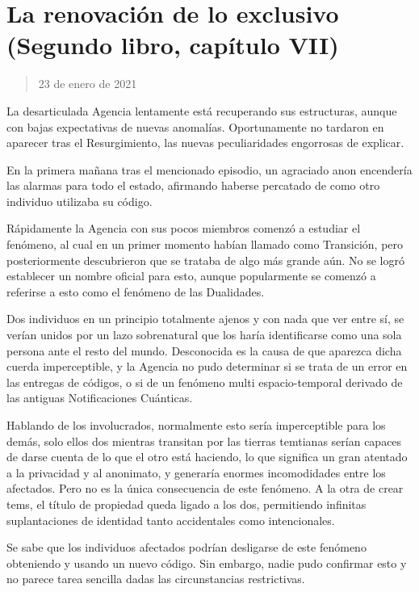 \documentclass[
]{book}
\begin{document}
\hypertarget{la-renovaciuxf3n-de-lo-exclusivo-segundo-libro-capuxedtulo-vii}{%
\section{La renovación de lo exclusivo (Segundo libro, capítulo VII)}\label{la-renovaciuxf3n-de-lo-exclusivo-segundo-libro-capuxedtulo-vii}}

\begin{quote}
23 de enero de 2021
\end{quote}

La desarticulada Agencia lentamente está recuperando sus estructuras, aunque con bajas expectativas de nuevas anomalías. Oportunamente no tardaron en aparecer tras el Resurgimiento, las nuevas peculiaridades engorrosas de explicar.

En la primera mañana tras el mencionado episodio, un agraciado anon encendería las alarmas para todo el estado, afirmando haberse percatado de como otro individuo utilizaba su código.

Rápidamente la Agencia con sus pocos miembros comenzó a estudiar el fenómeno, al cual en un primer momento habían llamado como Transición, pero posteriormente descubrieron que se trataba de algo más grande aún. No se logró establecer un nombre oficial para esto, aunque popularmente se comenzó a referirse a esto como el fenómeno de las Dualidades.

Dos individuos en un principio totalmente ajenos y con nada que ver entre sí, se verían unidos por un lazo sobrenatural que los haría identificarse como una sola persona ante el resto del mundo. Desconocida es la causa de que aparezca dicha cuerda imperceptible, y la Agencia no pudo determinar si se trata de un error en las entregas de códigos, o si de un fenómeno multi espacio-temporal derivado de las antiguas Notificaciones Cuánticas.

Hablando de los involucrados, normalmente esto sería imperceptible para los demás, solo ellos dos mientras transitan por las tierras temtianas serían capaces de darse cuenta de lo que el otro está haciendo, lo que significa un gran atentado a la privacidad y al anonimato, y generaría enormes incomodidades entre los afectados. Pero no es la única consecuencia de este fenómeno. A la otra de crear tems, el título de propiedad queda ligado a los dos, permitiendo infinitas suplantaciones de identidad tanto accidentales como intencionales.

Se sabe que los individuos afectados podrían desligarse de este fenómeno obteniendo y usando un nuevo código. Sin embargo, nadie pudo confirmar esto y no parece tarea sencilla dadas las circunstancias restrictivas.
\end{document}
